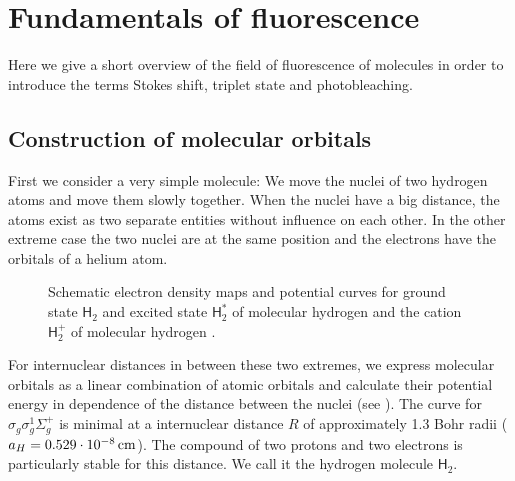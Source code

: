 \newenvironment{fenster}{%
  \begin{addmargin*}[
  5em]{5em}%
    \begin{minipage}{\linewidth}%
    \vspace{1em}
      \rule{\linewidth}{2pt}%
}{%
    \rule[
.25\baselineskip]{\linewidth}{2pt}%
\vspace{1em}
    \end{minipage}%
  \end{addmargin*}%
}
\renewcommand{\H}{\textsf{H}}
\renewcommand{\O}{\textsf{O}}
\section{Fundamentals of fluorescence}
\begin{summary}
  Here we give a short overview of the field of fluorescence of
  molecules in order to introduce the terms Stokes shift, triplet
  state and photobleaching.
\end{summary}
\subsection{Construction of molecular orbitals}
First we consider a very simple molecule: We move the nuclei of two
hydrogen atoms and move them slowly together. When the nuclei have a
big distance, the atoms exist as two separate entities without
influence on each other. In the other extreme case the two nuclei are
at the same position and the electrons have the orbitals of a helium
atom.
\begin{figure}[!hbt]
  \centering
  
  \caption{Schematic electron density maps and potential curves for
    ground state $\H_2$ and excited state $\H_2^*$ of molecular
    hydrogen and the cation $\H_2^+$ of molecular hydrogen
    \citep[inspired from][p.~258]{Haken2006}.}
  \label{fig:flu-potential_my}
\end{figure}

For internuclear distances in between these two extremes, we express
molecular orbitals as a linear combination of atomic orbitals and
calculate their potential energy in dependence of the distance between
the nuclei (see ). The curve for
$\sigma_g\sigma_g^1\Sigma_g^+$ is minimal at a internuclear distance
$R$ of approximately 1.3 Bohr radii
($a_H=\unit[0.529\cdot10^{-8}]{cm}$). The compound of two protons and
two electrons is particularly stable for this distance. We call it the
hydrogen molecule $\H_2$.

